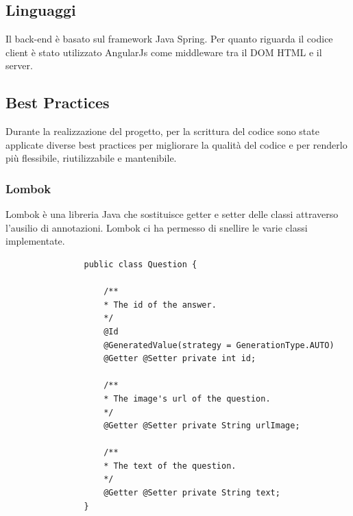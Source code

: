 \documentclass[12pt]{article}
\begin{document}
			
			\subsection{Linguaggi}
			Il back-end è basato sul framework Java Spring. Per quanto riguarda il codice client è stato utilizzato AngularJs come middleware tra il DOM HTML e il server.
			
			\subsection{Best Practices}
			Durante la realizzazione del progetto, per la scrittura del codice sono state applicate diverse best practices per migliorare la qualità del codice e per renderlo più flessibile, riutilizzabile e mantenibile.
			\subsubsection{Lombok}
			Lombok è una libreria Java che sostituisce getter e setter delle classi attraverso l'ausilio di annotazioni. Lombok ci ha permesso di snellire le varie classi implementate.
			\begin{lstlisting}
				public class Question {
					
					/**
					* The id of the answer.
					*/
					@Id
					@GeneratedValue(strategy = GenerationType.AUTO)
					@Getter	@Setter private int id;
					
					/**
					* The image's url of the question.
					*/
					@Getter	@Setter private String urlImage;
					
					/**
					* The text of the question.
					*/
					@Getter	@Setter private String text;
				}
			\end{lstlisting}
			
\end{document}
